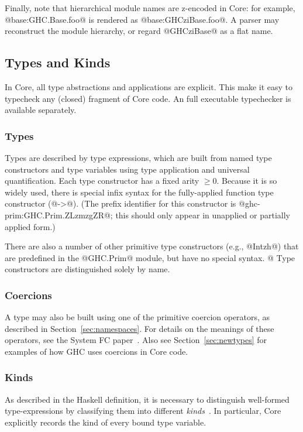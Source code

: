 \documentclass[10pt]{article}
\begin{document}
Finally, note that hierarchical module names are z-encoded in Core: for example, @base:GHC.Base.foo@ is rendered as @base:GHCziBase.foo@. A parser may reconstruct the module hierarchy, or regard @GHCziBase@ as a flat name.
\subsection{Types and Kinds}
\label{sec:typesandkinds}

In Core, all type abstractions and applications are explicit.  This make it easy to 
typecheck any (closed) fragment of Core code.  An full executable typechecker is available separately.

\subsubsection{Types}
Types are described by type expressions, which 
are built from named type constructors and type variables
using type application and universal quantification.  
Each type constructor has a fixed arity $\geq 0$.  
Because it is so widely used, there is
special infix syntax for the fully-applied function type constructor (@->@).
(The prefix identifier for this constructor is @ghc-prim:GHC.Prim.ZLzmzgZR@; this should
only appear in unapplied or partially applied form.)

There are also a number of other primitive type constructors (e.g., @Intzh@) that
are predefined in the @GHC.Prim@ module, but have no special syntax.
@%
Type constructors are distinguished solely by name.

\subsubsection{Coercions}

A type may also be built using one of the primitive coercion operators, as described in Section~\ref{sec:namespaces}. For details on the meanings of these operators, see the System FC paper~\citep{system-fc}. Also see Section~\ref{sec:newtypes} for examples of how GHC uses coercions in Core code.

\subsubsection{Kinds}
As described in the Haskell definition, it is necessary to distinguish 
well-formed type-expressions by classifying them into different {\it kinds}~\citep[p. 41]{haskell98}.
In particular, Core explicitly records the kind of every bound type variable. 
\end{document}
